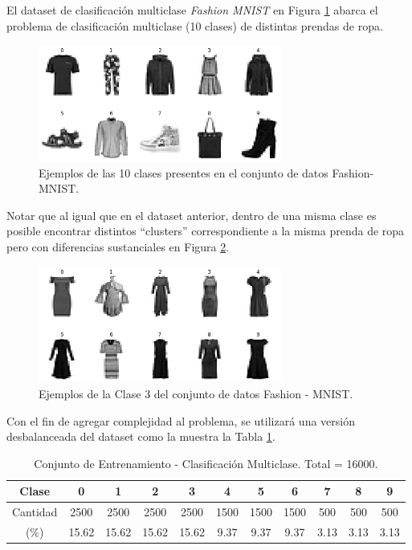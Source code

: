 El dataset de clasificación multiclase \textit{Fashion MNIST} en Figura \ref{fig:fashion_mnist} abarca el problema de clasificación multiclase (10 clases) de distintas prendas de ropa. 

\begin{figure}[ht]
    \centering
    \includegraphics[width=8cm]{img/tesis/fashion_mnist.png}
    \caption{Ejemplos de las 10 clases presentes en el conjunto de datos Fashion-MNIST.}
    \label{fig:fashion_mnist}
\end{figure}

\vspace{0.2cm}

Notar que al igual que en el dataset anterior, dentro de una misma clase es posible encontrar distintos ``clusters'' correspondiente a la misma prenda de ropa pero con diferencias sustanciales en Figura \ref{fig:fashion_mnist_label_3}.

\vspace{0.2CM}

\begin{figure}[ht]
    \centering
    \includegraphics[width=8cm]{img/tesis/fashion_mnist_label_3.png}
    \caption{Ejemplos de la Clase 3 del conjunto de datos Fashion - MNIST.}
    \label{fig:fashion_mnist_label_3}
\end{figure}

Con el fin de agregar complejidad al problema, se utilizará una versión desbalanceada del dataset como la muestra la Tabla \ref{table:fashion_mnist}.

\begin{table}[ht]
\begin{tabular}{|c|c|c|c|c|c|c|c|c|c|c|}
\hline
Clase    & 0    & 1    & 2    & 3    & 4    & 5    & 6   & 7   & 8   & 9   \\ \hline
Cantidad & 2500 & 2500 & 2500 & 2500 & 1500 & 1500 & 1500 & 500 & 500 & 500 \\ \hline
(\%) & 15.62 & 15.62 & 15.62 & 15.62 & 9.37 & 9.37 & 9.37 & 3.13 & 3.13 & 3.13 \\ \hline
\end{tabular}
\caption{Conjunto de Entrenamiento - Clasificación Multiclase. Total = 16000.}
\label{table:fashion_mnist}
\end{table}

